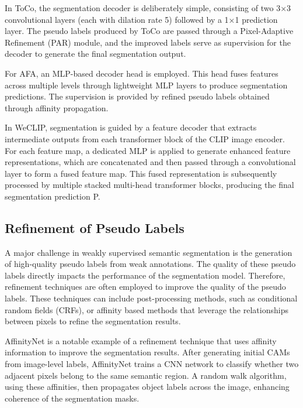 In ToCo\cite{wsss_toco_token_contrast}, the segmentation decoder is deliberately simple, consisting of two 3×3 convolutional layers (each with dilation rate 5) followed by a 1×1 prediction layer. The pseudo labels produced by ToCo are passed through a Pixel-Adaptive Refinement (PAR) module, and the improved labels serve as supervision for the decoder to generate the final segmentation output.

For AFA\cite{wsss_afa_affinity_from_attention}, an MLP-based decoder head is employed. This head fuses features across multiple levels through lightweight MLP layers to produce segmentation predictions. The supervision is provided by refined pseudo labels obtained through affinity propagation.

In WeCLIP\cite{wsss_frozen_clip}, segmentation is guided by a feature decoder that extracts intermediate outputs from each transformer block of the CLIP image encoder. For each feature map, a dedicated MLP is applied to generate enhanced feature representations, which are concatenated and then passed through a convolutional layer to form a fused feature map. This fused representation is subsequently processed by multiple stacked multi-head transformer blocks, producing the final segmentation prediction P.

\subsection{Refinement of Pseudo Labels}
\label{subsec:refinement-of-pseudo-labels}
A major challenge in weakly supervised semantic segmentation is the generation of high-quality pseudo labels from weak annotations. The quality of these pseudo labels directly impacts the performance of the segmentation model. Therefore, refinement techniques are often employed to improve the quality of the pseudo labels. These techniques can include post-processing methods, such as conditional random fields (CRFs), or affinity based methods that leverage the relationships between pixels to refine the segmentation results.

AffinityNet \cite{wsss_affinitynet} is a notable example of a refinement technique that uses affinity information to improve the segmentation results. After generating initial CAMs from image-level labels, AffinityNet trains a CNN network to classify whether two adjacent pixels belong to the same semantic region. A random walk algorithm, using these affinities, then propagates object labels across the image, enhancing coherence of the segmentation masks.


